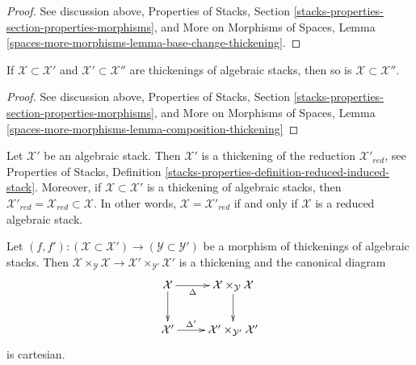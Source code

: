 \begin{proof}
See discussion above, Properties of Stacks, Section
\ref{stacks-properties-section-properties-morphisms}, and
More on Morphisms of Spaces, Lemma
\ref{spaces-more-morphisms-lemma-base-change-thickening}.
\end{proof}

\begin{lemma}
\label{lemma-composition-thickening}
If $\mathcal{X} \subset \mathcal{X}'$ and $\mathcal{X}' \subset \mathcal{X}''$
are thickenings of algebraic stacks, then so is
$\mathcal{X} \subset \mathcal{X}''$.
\end{lemma}

\begin{proof}
See discussion above, Properties of Stacks, Section
\ref{stacks-properties-section-properties-morphisms}, and
More on Morphisms of Spaces, Lemma
\ref{spaces-more-morphisms-lemma-composition-thickening}
\end{proof}

\begin{example}
\label{example-reduction-thickening}
Let $\mathcal{X}'$ be an algebraic stack. Then $\mathcal{X}'$ is a thickening
of the reduction $\mathcal{X}'_{red}$, see
Properties of Stacks, Definition
\ref{stacks-properties-definition-reduced-induced-stack}.
Moreover, if $\mathcal{X} \subset \mathcal{X}'$ is a thickening
of algebraic stacks, then
$\mathcal{X}'_{red} = \mathcal{X}_{red} \subset \mathcal{X}$.
In other words, $\mathcal{X} = \mathcal{X}'_{red}$ if and only
if $\mathcal{X}$ is a reduced algebraic stack.
\end{example}

\begin{lemma}
\label{lemma-reduced-diagonal}
Let $(f, f') : (\mathcal{X} \subset \mathcal{X}') \to
(\mathcal{Y} \subset \mathcal{Y}')$ be a morphism of thickenings
of algebraic stacks. Then
$\mathcal{X} \times_\mathcal{Y} \mathcal{X} \to
\mathcal{X}' \times_{\mathcal{Y}'} \mathcal{X}'$
is a thickening and the canonical diagram
$$
\xymatrix{
\mathcal{X} \ar[r]_-\Delta \ar[d] &
\mathcal{X} \times_\mathcal{Y} \mathcal{X} \ar[d] \\
\mathcal{X}' \ar[r]^-{\Delta'} &
\mathcal{X}' \times_{\mathcal{Y}'} \mathcal{X}'
}
$$
is cartesian.
\end{lemma}


